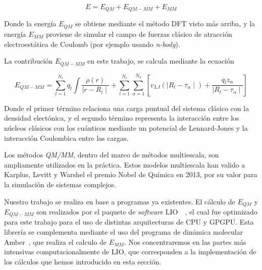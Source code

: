 \begin{equation}
    E = E_{QM} + E_{QM-MM} + E_{MM}
\end{equation}

Donde la energ\'ia $E_{QM}$ se obtiene mediante el m\'etodo DFT visto m\'as arriba, y la energ\'ia
$E_{MM}$ proviene de simular el campo de fuerzas cl\'asico de atracci\'on electroest\'atica de
Coulomb (por ejemplo usando \textit{n-body}).

La contribuci\'on $E_{QM-MM}$ en este trabajo, se calcula mediante la ecuaci\'on

\begin{equation}
    E_{QM-MM} = \sum_{l = 1}^{N_c} q_l \int \frac{\rho(r)}{\mid r - R_l \mid} + \sum_{l = 1}^{N_c}\sum_{\alpha = 1}^{N_q} [ v_{LJ} ( \mid R_l - \tau_\alpha \mid ) + \frac{q_l z_\alpha}{\mid R_l - \tau_\alpha \mid} ]
\end{equation}

Donde el primer t\'ermino relaciona una carga puntual del sistema cl\'asico con la densidad
elect\'onica, y el segundo t\'ermino representa la interacci\'on entre los n\'ucleos cl\'asicos
con los cu\'anticos mediante un potencial de Lennard-Jones y la interacci\'on Coulombica entre
las cargas.

Los m\'etodos \textit{QM/MM}, dentro del marco de m\'etodos multiescala, son ampliamente utilizados en
la pr\'actica. Estos modelos multiescala han valido a Karplus, Levitt y
Warshel el premio Nobel de Qu\'imica en 2013, por su valor para la simulaci\'on de sistemas complejos.

Nuestro trabajo se realiza en base a programas ya existentes. El c\'alculo de $E_{QM}$ y $E_{QM-MM}$ son realizados por el paquete de \textit{software} LIO~\cite{LIO}~\cite{TesisNitsche}, el cual fue optimizado para este trabajo para el uso de distintas arquitecturas de CPU y GPGPU. Esta librer\'ia
se complementa mediante el uso del programa de din\'amica molecular Amber~\cite{Amber}, que realiza el calculo
de $E_{MM}$. Nos concentraremos en las partes m\'as intensivas computacionalmente de LIO, que corresponden a la
implementaci\'on de los c\'alculos que hemos introducido en esta secci\'on.
